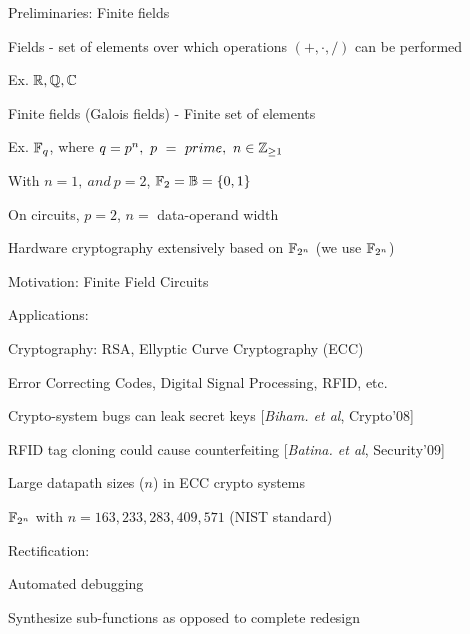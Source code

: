 
\begin{frame}{\large Preliminaries: Finite fields}
\bi
	\item Fields - set of elements over which operations $(+,\cdot,/)$ can be performed 
	\bi
		\item Ex. ${\mathbb{R}},{\mathbb{Q}},{\mathbb{C}}$
	\ei
	\pause
	\vspace{0.1in}
	\item Finite fields (Galois fields) - Finite set of elements
	\bi
		\pause
		\item Ex. ${\mathbb{F}}_q$, where $q=p^n,~p~=~prime,~n \in {\mathbb{Z}}_{\geq 1}$ 
		\bi
		\item With $n=1,~and~p=2$, ${\mathbb{F}}_2 = {\mathbb{B}} = \{0,1\}$
		\ei
		\pause
		\item On circuits, $p=2$, $n=$ data-operand width
	\ei
	\pause
	\vspace{0.1in}
	\item Hardware cryptography extensively based on ${\mathbb{F}}_{2^n}$ (we use ${\mathbb{F}}_{2^n}$)
\ei
\end{frame}

\begin{frame}{\large Motivation: Finite Field Circuits}
\bi
	\item Applications:
	\bi
		\item Cryptography: RSA, Ellyptic Curve Cryptography (ECC) 
		\item Error Correcting Codes, Digital Signal Processing, RFID, etc.
		\pause
		\bi
			\item Crypto-system bugs can leak secret keys [{\it Biham. et al}, Crypto'08]
			\item RFID tag cloning could cause counterfeiting [{\it Batina. et al}, Security'09]
		\ei
		\pause
		\item Large datapath sizes ($n$) in ECC crypto systems 
		\bi
			\item ${\mathbb{F}}_{2^n}$ with $n=163, 233, 283, 409, 571$ (NIST standard)
		\ei
	\ei
	\pause
	\vspace{0.1in}
	\item Rectification: 
	\bi
		\item Automated debugging
		\item Synthesize sub-functions as opposed to complete redesign
	\ei
\ei
\end{frame}

